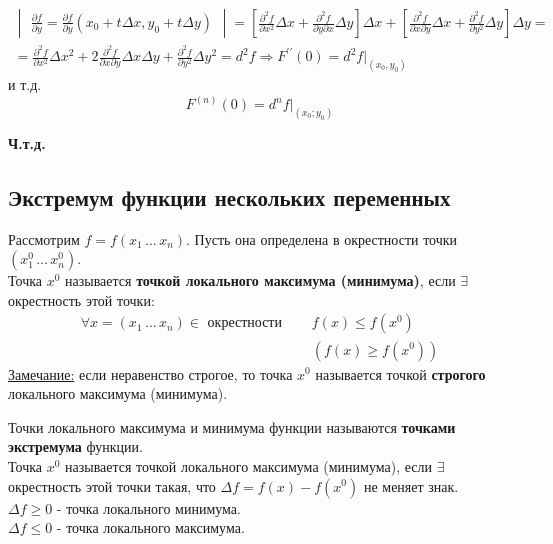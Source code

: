 \documentclass[12pt]{article}
\begin{document}
\begin{adjustwidth}{1.5em}{1.5em}
\begin{gather*}
\begin{vmatrix}
                \frac{\partial f}{\partial y}=\frac{\partial f}{\partial y}\left(x_0+t \Delta x, y_0+t \Delta y\right)
            \end{vmatrix} =\left[\frac{\partial^2 f}{\partial x^2} \Delta x+\frac{\partial^2 f}{\partial y \partial x} \Delta y\right] \Delta x+\left[\frac{\partial^2 f}{\partial x \partial y} \Delta x+\frac{\partial^2 f}{\partial y^2} \Delta y\right] \Delta y \boxed{=}  \\
            \boxed{=} \frac{\partial^2 f}{\partial x^2} \Delta x^2+2 \frac{\partial^2 f}{\partial x \partial y} \Delta x \Delta y+\frac{\partial^2 f}{\partial y^2} \Delta y^2=d^2 f \Rightarrow F^{\prime \prime}(0)=d^2 f \Big|_{(x_0, y_0)}
        \end{gather*}
        и т.д.
        \[ F^{(n)}(0) = d^n f \Big|_{(x_0; y_0)} \]
        \begin{center}
            \textbf{Ч.т.д.}
        \end{center}
    \end{adjustwidth}

    \subsection{Экстремум функции нескольких переменных}\noindent
    Рассмотрим $f = f(x_1\, \dots\, x_n)$. Пусть она определена в окрестности точки $(x^0_1\, \dots\, x^0_n)$.\\
    Точка $x^0$ называется \textbf{точкой локального максимума (минимума)}, если $\exists$ окрестность этой точки:
    \begin{align*} 
        \forall x = (x_1\, \dots\, x_n) \in \text{ окрестности } \quad &f(x) \le f(x^0) \\
        &(f(x) \ge f(x^0))
    \end{align*}
    \underline{Замечание:} если неравенство строгое, то точка $x^0$ называется точкой \textbf{строгого} локального максимума (минимума).\par\noindent
    Точки локального максимума и минимума функции называются \textbf{точками экстремума} функции.\\
    Точка $x^0$ называется точкой локального максимума (минимума), если $\exists$ окрестность этой точки такая, что $\Delta f = f(x) - f(x^0)$ не меняет знак.\\
    $\Delta f \ge 0$ - точка локального минимума.\\
    $\Delta f \le 0$ - точка локального максимума.
\end{document}
